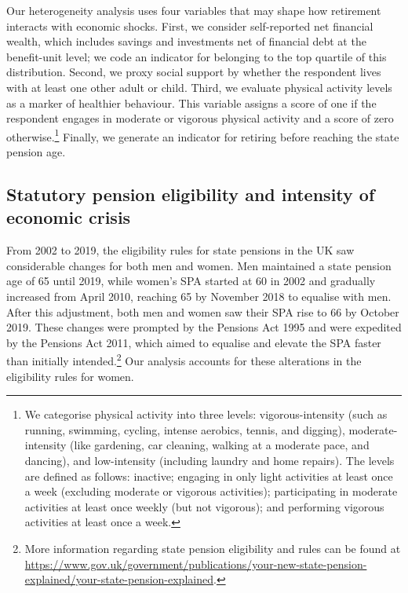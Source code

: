 \documentclass[arguments, manuscript, 11pt]{aastex631}
\begin{document}
Our heterogeneity analysis uses four variables that may shape how retirement interacts with economic shocks. First, we consider self-reported net financial wealth, which includes savings and investments net of financial debt at the benefit-unit level; we code an indicator for belonging to the top quartile of this distribution. Second, we proxy social support by whether the respondent lives with at least one other adult or child. Third, we evaluate physical activity levels as a marker of healthier behaviour. This variable assigns a score of one if the respondent engages in moderate or vigorous physical activity and a score of zero otherwise.\footnote{We categorise physical activity into three levels: vigorous-intensity (such as running, swimming, cycling, intense aerobics, tennis, and digging), moderate-intensity (like gardening, car cleaning, walking at a moderate pace, and dancing), and low-intensity (including laundry and home repairs). The levels are defined as follows: inactive; engaging in only light activities at least once a week (excluding moderate or vigorous activities); participating in moderate activities at least once weekly (but not vigorous); and performing vigorous activities at least once a week.} Finally, we generate an indicator for retiring before reaching the state pension age.

\subsection{Statutory pension eligibility and intensity of economic crisis } \label{sec:SPA}

From 2002 to 2019, the eligibility rules for state pensions in the UK saw considerable changes for both men and women. Men maintained a state pension age of 65 until 2019, while women’s SPA started at 60 in 2002 and gradually increased from April 2010, reaching 65 by November 2018 to equalise with men. After this adjustment, both men and women saw their SPA rise to 66 by October 2019. These changes were prompted by the Pensions Act 1995 and were expedited by the Pensions Act 2011, which aimed to equalise and elevate the SPA faster than initially intended.\footnote{More information regarding state pension eligibility and rules can be found at \url{https://www.gov.uk/government/publications/your-new-state-pension-explained/your-state-pension-explained}.} Our analysis accounts for these alterations in the eligibility rules for women.
\end{document}
